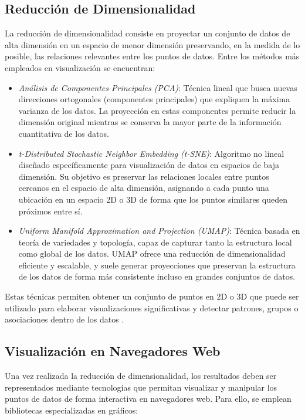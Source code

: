 \documentclass{article}
\begin{document}
\subsection{Reducción de Dimensionalidad}

La reducción de dimensionalidad consiste en proyectar un conjunto de datos de alta dimensión en un espacio de menor dimensión preservando, en la medida de lo posible, las relaciones relevantes entre los puntos de datos. Entre los métodos más empleados en visualización se encuentran:

\begin{itemize}
    \item \textit{Análisis de Componentes Principales (PCA)}: Técnica lineal que busca nuevas direcciones ortogonales (componentes principales) que expliquen la máxima varianza de los datos. La proyección en estas componentes permite reducir la dimensión original mientras se conserva la mayor parte de la información cuantitativa de los datos.
    \item \textit{t-Distributed Stochastic Neighbor Embedding (t-SNE)}: Algoritmo no lineal diseñado específicamente para visualización de datos en espacios de baja dimensión. Su objetivo es preservar las relaciones locales entre puntos cercanos en el espacio de alta dimensión, asignando a cada punto una ubicación en un espacio 2D o 3D de forma que los puntos similares queden próximos entre sí.
    \item \textit{Uniform Manifold Approximation and Projection (UMAP)}: Técnica basada en teoría de variedades y topología, capaz de capturar tanto la estructura local como global de los datos. UMAP ofrece una reducción de dimensionalidad eficiente y escalable, y suele generar proyecciones que preservan la estructura de los datos de forma más consistente incluso en grandes conjuntos de datos.
\end{itemize}

Estas técnicas permiten obtener un conjunto de puntos en 2D o 3D que puede ser utilizado para elaborar visualizaciones significativas y detectar patrones, grupos o asociaciones dentro de los datos .

\subsection{Visualización en Navegadores Web}

Una vez realizada la reducción de dimensionalidad, los resultados deben ser representados mediante tecnologías que permitan visualizar y manipular los puntos de datos de forma interactiva en navegadores web. Para ello, se emplean bibliotecas especializadas en gráficos:
\end{document}
